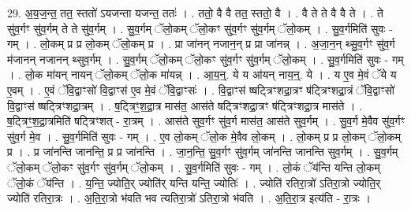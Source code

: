 \documentclass[17pt]{extarticle}
\begin{document}
29. अ॒य॒ज॒न्त॒ तत॒ स्ततो॑ ऽयजन्ता यजन्त॒ ततः॑ । . ततो॒ वै वै तत॒ स्ततो॒ वै । . वै ते ते वै वै ते । . ते सु॑व॒र्गꣳ सु॑व॒र्गम् ते ते सु॑व॒र्गम् । . सु॒व॒र्गम् ॅलो॒कम् ॅलो॒कꣳ सु॑व॒र्गꣳ सु॑व॒र्गम् ॅलो॒कम् । . सु॒व॒र्गमिति॑ सुवः - गम् । . लो॒कम् प्र प्र लो॒कम् ॅलो॒कम् प्र । . प्रा जा॑नन् नजान॒न् प्र प्रा जा॑नन्न् । . अ॒जा॒न॒न् थ्सु॒व॒र्गꣳ सु॑व॒र्ग म॑जानन् नजानन् थ्सुव॒र्गम् । . सु॒व॒र्गम् ॅलो॒कम् ॅलो॒कꣳ सु॑व॒र्गꣳ सु॑व॒र्गम् ॅलो॒कम् । . सु॒व॒र्गमिति॑ सुवः - गम् । . लो॒क मा॑यन् नायन् ॅलो॒कम् ॅलो॒क मा॑यन्न् । . आ॒य॒न्॒. ये य आ॑यन् नाय॒न्॒. ये । . य ए॒व मे॒वं ॅये य ए॒वम् । . ए॒वं ॅवि॒द्वाꣳसो॑ वि॒द्वाꣳस॑ ए॒व मे॒वं ॅवि॒द्वाꣳसः॑ । . वि॒द्वाꣳस॑ ष्षट्त्रिꣳशद्रा॒त्रꣳ ष॑ट्त्रिꣳशद्रा॒त्रं ॅवि॒द्वाꣳसो॑ वि॒द्वाꣳस॑ 
ष्षट्त्रिꣳशद्रा॒त्रम् । . ष॒ट्त्रिꣳ॒॒श॒द्रा॒त्र मास॑त॒ आस॑ते षट्त्रिꣳशद्रा॒त्रꣳ ष॑ट्त्रिꣳशद्रा॒त्र मास॑ते । . ष॒ट्त्रिꣳ॒॒श॒द्रा॒त्रमिति॑ षट्त्रिꣳशत् - रा॒त्रम् । . आस॑ते सुव॒र्गꣳ सु॑व॒र्ग मास॑त॒ आस॑ते सुव॒र्गम् । . सु॒व॒र्ग मे॒वैव सु॑व॒र्गꣳ सु॑व॒र्ग मे॒व । . सु॒व॒र्गमिति॑ सुवः - गम् । . ए॒व लो॒कम् ॅलो॒क मे॒वैव लो॒कम् । . लो॒कम् प्र प्र लो॒कम् ॅलो॒कम् प्र । . प्र जा॑नन्ति जानन्ति॒ प्र प्र जा॑नन्ति । . जा॒न॒न्ति॒ सु॒व॒र्गꣳ सु॑व॒र्गम् जा॑नन्ति जानन्ति सुव॒र्गम् । . सु॒व॒र्गम् ॅलो॒कम् ॅलो॒कꣳ सु॑व॒र्गꣳ सु॑व॒र्गम् ॅलो॒कम् । . सु॒व॒र्गमिति॑ सुवः - गम् । . लो॒कं ॅय॑न्ति यन्ति लो॒कम् ॅलो॒कं ॅय॑न्ति । . य॒न्ति॒ ज्योति॒र् ज्योति॑र् यन्ति यन्ति॒ ज्योतिः॑ । . ज्योति॑ रतिरा॒त्रो॑ ऽतिरा॒त्रो ज्योति॒र् ज्योति॑ रतिरा॒त्रः । . अ॒ति॒रा॒त्रो भ॑वति भव त्यतिरा॒त्रो॑ ऽतिरा॒त्रो भ॑वति । . अ॒ति॒रा॒त्र इत्य॑ति - रा॒त्रः । \newline
\end{document}
